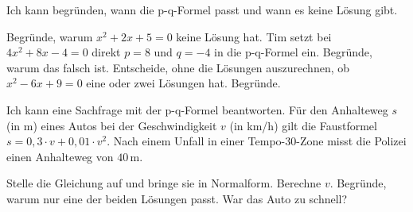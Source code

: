 \begin{aufgabe}{Ich kann begründen, wann die p-q-Formel passt und wann es keine Lösung gibt.}
\begin{teile}
\teil Begründe, warum $x^2 + 2x + 5 = 0$ keine Lösung hat.
\teil Tim setzt bei $4x^2 + 8x - 4 = 0$ direkt $p = 8$ und $q = -4$ in die p-q-Formel ein. Begründe, warum das falsch ist.
\teil Entscheide, ohne die Lösungen auszurechnen, ob $x^2 - 6x + 9 = 0$ eine oder zwei Lösungen hat. Begründe.
\end{teile}
\end{aufgabe}

\begin{aufgabe}{Ich kann eine Sachfrage mit der p-q-Formel beantworten. Für den Anhalteweg $s$ (in m) eines Autos bei der Geschwindigkeit $v$ (in km/h) gilt die Faustformel $s = 0{,}3 \cdot v + 0{,}01 \cdot v^2$. Nach einem Unfall in einer Tempo-30-Zone misst die Polizei einen Anhalteweg von $40\,$m.}
\begin{teile}
\teil Stelle die Gleichung auf und bringe sie in Normalform.
\teil Berechne $v$.
\teil Begründe, warum nur eine der beiden Lösungen passt. War das Auto zu schnell?
\end{teile}
\end{aufgabe}
